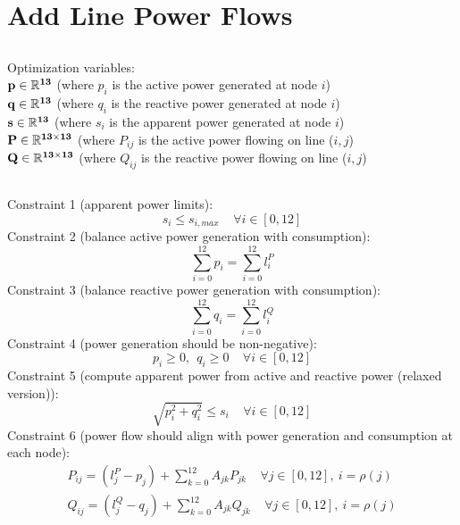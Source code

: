 \documentclass[12pt]{article}
\begin{document}
\section{Add Line Power Flows}
\subsection{}
Optimization variables:\\
$\bf{p}\in\mathbb{R}^{13}$ (where $p_i$ is the active power generated at node $i$)\\
$\bf{q}\in\mathbb{R}^{13}$ (where $q_i$ is the reactive power generated at node $i$)\\
$\bf{s}\in\mathbb{R}^{13}$ (where $s_i$ is the apparent power generated at node $i$)\\
$\bf{P}\in\mathbb{R}^{13\times13}$ (where $P_{ij}$ is the active power flowing on line ($i,j$)\\
$\bf{Q}\in\mathbb{R}^{13\times13}$ (where $Q_{ij}$ is the reactive power flowing on line ($i,j$)\\
\subsection{}
Constraint 1 (apparent power limits): 
\begin{equation}
s_i\leq s_{i,max}\ \ \ \ \ \forall i\in [0, 12]
\end{equation}
Constraint 2 (balance active power generation with consumption):
\begin{equation}
\sum_{i=0}^{12}p_i=\sum_{i=0}^{12}l_i^P
\end{equation}
Constraint 3 (balance reactive power generation with consumption):
\begin{equation}
\sum_{i=0}^{12}q_i=\sum_{i=0}^{12}l_i^Q
\end{equation}
Constraint 4 (power generation should be non-negative):
\begin{equation}
p_i\geq 0,\ \ q_i\geq 0 \ \ \ \ \ \forall i\in [0, 12]
\end{equation}
Constraint 5 (compute apparent power from active and reactive power (relaxed version)):
\begin{equation}
\sqrt{p_i^2+q_i^2}\leq s_i \ \ \ \ \ \forall i\in [0, 12]
\end{equation}
Constraint 6 (power flow should align with power generation and consumption at each node):
\begin{align}
P_{ij}=(l_j^P-p_j)+\sum_{k=0}^{12}A_{jk}P_{jk} \ \ \ \ \ \forall j\in [0, 12],\ i=\rho(j)\\
Q_{ij}=(l_j^Q-q_j)+\sum_{k=0}^{12}A_{jk}Q_{jk} \ \ \ \ \ \forall j\in [0, 12],\ i=\rho(j)
\end{align}
\end{document}
